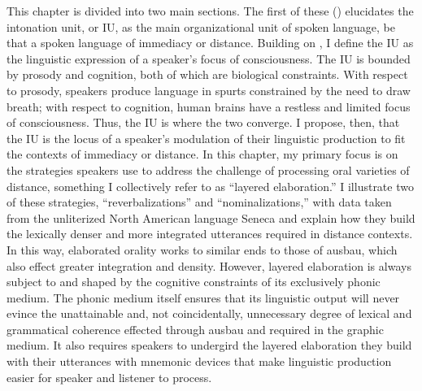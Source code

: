 This chapter is divided into two main sections. The first of these () elucidates the intonation unit, or IU, as the main organizational unit of spoken language, be that a spoken language of immediacy or distance. Building on \citet{Chafe1994}, I define the IU as the linguistic expression of a speaker’s focus of consciousness. The IU is bounded by prosody and cognition, both of which are biological constraints. With respect to prosody, speakers produce language in spurts constrained by the need to draw breath; with respect to cognition, human brains have a restless and limited focus of consciousness. Thus, the IU is where the two converge. I propose, then, that the IU is the locus of a speaker’s modulation of their linguistic production to fit the contexts of immediacy or distance. In this chapter, my primary focus is on the strategies speakers use to address the challenge of processing oral varieties of distance, something I collectively refer to as “layered elaboration.” I illustrate two of these strategies, “reverbalizations” and “nominalizations,” with data taken from the unliterized North American language Seneca and explain how they build the lexically denser and more integrated utterances required in distance contexts. In this way, elaborated orality works to similar ends to those of ausbau, which also effect greater integration and density. However, layered elaboration is always subject to and shaped by the cognitive constraints of its exclusively phonic medium. The phonic medium itself ensures that its linguistic output will never evince the unattainable and, not coincidentally, unnecessary degree of lexical and grammatical coherence effected through ausbau and required in the graphic medium. It also requires speakers to undergird the layered elaboration they build with their utterances with mnemonic devices that make linguistic production easier for speaker and listener to process.

